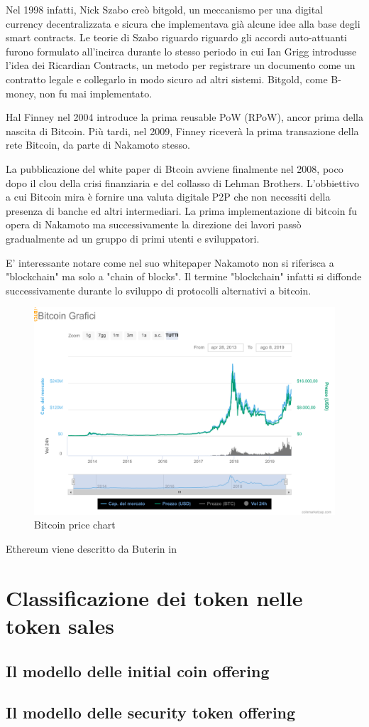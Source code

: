 Nel 1998 infatti, Nick Szabo creò bitgold, un meccanismo per una digital currency decentralizzata e sicura che implementava già alcune idee alla base degli smart contracts. Le teorie di Szabo riguardo riguardo gli accordi auto-attuanti furono formulato all'incirca durante lo stesso periodo in cui Ian Grigg introdusse l'idea dei Ricardian Contracts, un metodo per registrare un documento come un contratto legale e collegarlo in modo sicuro ad altri sistemi. Bitgold, come B-money, non fu mai implementato.
 
 Hal Finney nel 2004 introduce la prima reusable PoW (RPoW), ancor prima della nascita di Bitcoin. Più tardi, nel 2009, Finney riceverà la prima transazione della rete Bitcoin, da parte di Nakamoto stesso. 

La pubblicazione del white paper di Btcoin avviene finalmente nel 2008, poco dopo il clou della crisi finanziaria e del collasso di Lehman Brothers. L'obbiettivo a cui Bitcoin mira è fornire una valuta digitale P2P che non necessiti della presenza di banche ed altri intermediari.  La prima implementazione di bitcoin fu opera di Nakamoto ma successivamente la direzione dei lavori passò gradualmente ad un gruppo di primi utenti e sviluppatori. 

E' interessante notare come nel suo whitepaper Nakamoto non si riferisca a "blockchain" ma solo a "chain of blocks". Il termine "blockchain" infatti si diffonde successivamente durante lo sviluppo di protocolli alternativi a bitcoin. 



\begin{figure}[H]
  \includegraphics[width=\linewidth]{chartbitcoin.png}
  \caption{Bitcoin price chart}
  \label{fig:chartbitcoin}
\end{figure}


Ethereum viene descritto da Buterin in 

\section{Classificazione dei token nelle token sales}

\subsection{Il modello delle initial coin offering}
\subsection{Il modello delle security token offering}
